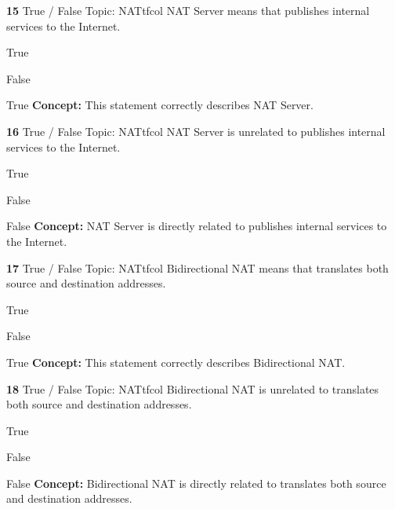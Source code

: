 \documentclass[10pt,a4paper]{article}
\begin{document}
\begin{qcard}{\color{white}\textbf{15} \hfill \small True / False \textbar{} Topic: NAT}{tfcol}
NAT Server means that publishes internal services to the Internet.

\begin{qoptions}
\item True
\item False
\end{qoptions}
\begin{explainbox}{True}
\textbf{Concept:} This statement correctly describes NAT Server.
\end{explainbox}
\end{qcard}

\begin{qcard}{\color{white}\textbf{16} \hfill \small True / False \textbar{} Topic: NAT}{tfcol}
NAT Server is unrelated to publishes internal services to the Internet.

\begin{qoptions}
\item True
\item False
\end{qoptions}
\begin{explainbox}{False}
\textbf{Concept:} NAT Server is directly related to publishes internal services to the Internet.
\end{explainbox}
\end{qcard}

\begin{qcard}{\color{white}\textbf{17} \hfill \small True / False \textbar{} Topic: NAT}{tfcol}
Bidirectional NAT means that translates both source and destination addresses.

\begin{qoptions}
\item True
\item False
\end{qoptions}
\begin{explainbox}{True}
\textbf{Concept:} This statement correctly describes Bidirectional NAT.
\end{explainbox}
\end{qcard}

\begin{qcard}{\color{white}\textbf{18} \hfill \small True / False \textbar{} Topic: NAT}{tfcol}
Bidirectional NAT is unrelated to translates both source and destination addresses.

\begin{qoptions}
\item True
\item False
\end{qoptions}
\begin{explainbox}{False}
\textbf{Concept:} Bidirectional NAT is directly related to translates both source and destination addresses.
\end{explainbox}
\end{qcard}
\end{document}
